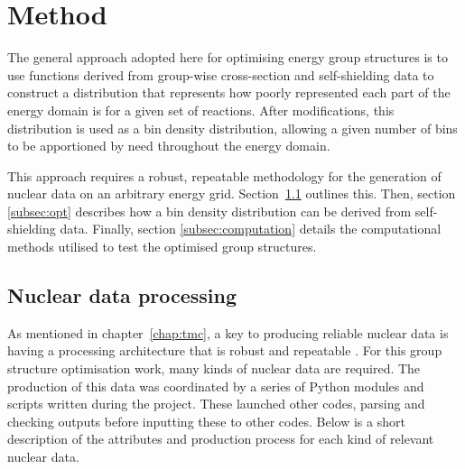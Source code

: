 


\section{Method}
\label{sec:method}
The general approach adopted here for optimising energy group structures is to use functions derived from group-wise cross-section and self-shielding data to construct a distribution that represents how poorly represented each part of the energy domain is for a given set of reactions. After modifications, this distribution is used as a bin density distribution, allowing a given number of bins to be apportioned by need throughout the energy domain. 

This approach requires a robust, repeatable methodology for the generation of nuclear data on an arbitrary energy grid. Section~\ref{subsec:nd_processing} outlines this. Then, section \ref{subsec:opt} describes how a bin density distribution can be derived from self-shielding data. Finally, section \ref{subsec:computation} details the computational methods utilised to test the optimised group structures.

\subsection{Nuclear data processing}
\label{subsec:nd_processing}
As mentioned in chapter~\ref{chap:tmc}, a key to producing reliable nuclear data is having a processing architecture that is robust and repeatable \cite{Koning2008}. For this group structure optimisation work, many kinds of nuclear data are required. The production of this data was coordinated by a series of Python modules and scripts written during the project. These launched other codes, parsing and checking outputs before inputting these to other codes. Below is a short description of the attributes and production process for each kind of relevant nuclear data.

